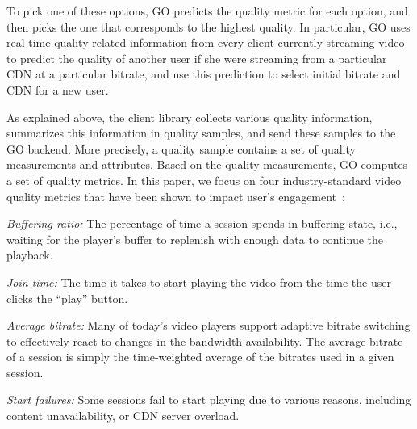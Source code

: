 To pick one of these options, GO predicts the quality metric for each
option, and then picks the one that corresponds to the highest
quality. In particular, GO uses real-time quality-related information
from every client currently streaming video to predict the quality of
another user if she were streaming from a particular CDN at a
particular bitrate, and use this prediction to select initial bitrate
and CDN for a new user.


\label{subsec:dataset}

As explained above, the client library collects various quality
information, summarizes this information in quality samples, and send
these samples to the GO backend. More precisely, a quality sample
contains a set of quality measurements and attributes. Based on the
quality measurements, GO computes a set of quality metrics. In this
paper, we focus on four industry-standard video quality metrics that
have been shown to impact user's engagement~\cite{sigcomm11}:

\begin{packedenumerate}
\item \emph{Buffering ratio:} The percentage of time a session spends
  in buffering state, i.e., waiting for the player's buffer to
  replenish with enough data to continue the playback.
\item \emph{Join time:} The time it takes to start playing the video
  from the time the user clicks the ``play'' button.
\item \emph{Average bitrate:} Many of today's video players support
  adaptive bitrate switching to effectively react to changes in the
  bandwidth availability. The average bitrate of a session is simply
  the time-weighted average of the bitrates used in a given session.
\item \emph{Start failures:} Some sessions fail to start playing due
  to various reasons, including content unavailability, or CDN server
  overload.
\end{packedenumerate}

